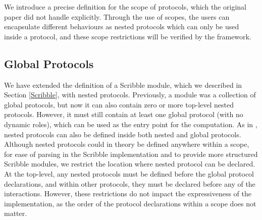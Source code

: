 \documentclass[12pt,twoside]{report}
\begin{document}
We introduce a precise definition for the scope of protocols, which the original paper\cite{nestedprotocols} did not handle explicitly. Through the use of scopes, the users can encapsulate different behaviours as nested protocols which can only be used inside a protocol, and these scope restrictions will be verified by the framework.\\

\subsection{Global Protocols}\label{scr-global-protocols}

We have extended the definition of a Scribble module, which we described in Section \ref{Scribble}, with nested protocols. Previously, a module was a collection of global protocols, but now it can also contain zero or more top-level nested protocols. However, it must still contain at least one global protocol (with no dynamic roles), which can be used as the entry point for the computation. As in \cite{nestedprotocols}, nested protocols can also be defined inside both nested and global protocols.\\

Although nested protocols could in theory be defined anywhere within a scope, for ease of parsing in the Scribble implementation and to provide more structured Scribble modules, we restrict the location where nested protocol can be declared. At the top-level, any nested protocols must be defined before the global protocol declarations, and within other protocols, they must be declared before any of the interactions. However, these restrictions do not impact the expressiveness of the implementation, as the order of the protocol declarations within a scope does not matter.\\
\end{document}
